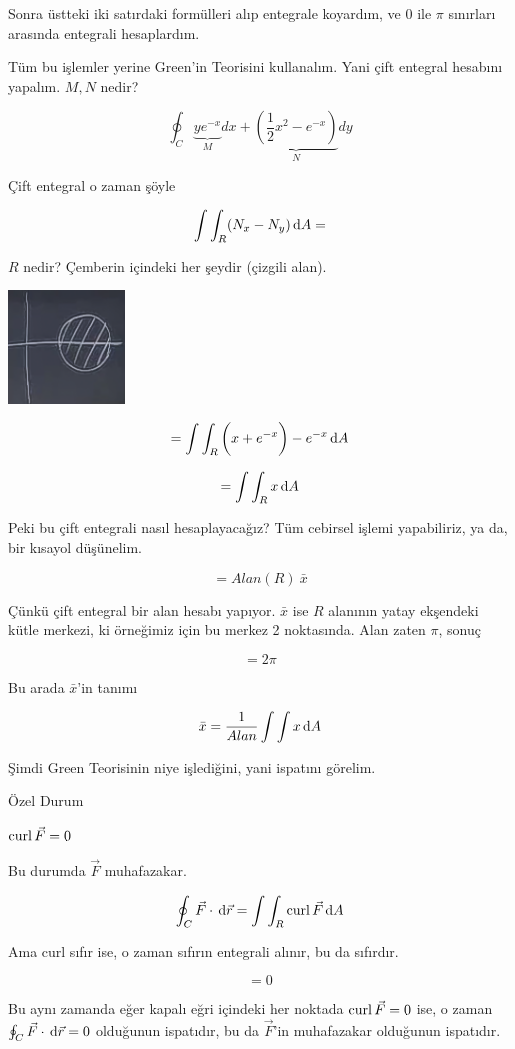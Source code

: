\documentclass[12pt,fleqn]{article}\usepackage{../../common}
\begin{document}
Sonra üstteki iki satırdaki formülleri alıp entegrale koyardım, ve 0 ile
$\pi$ sınırları arasında entegrali hesaplardım. 

Tüm bu işlemler yerine Green'in Teorisini kullanalım. Yani çift entegral
hesabını yapalım. $M,N$ nedir? 

$$ \oint_C 
\underbrace{ye^{-x}}_{M} dx + 
\underbrace{(\frac{1}{2}x^2 - e^{-x})}_{N}dy
$$

Çift entegral o zaman şöyle

$$ \int \int_R (N_x - N_y) \,\mathrm{d} A = $$

$R$ nedir? Çemberin içindeki her şeydir (çizgili alan). 

\includegraphics[height=3cm]{22_2.png}

$$= \int \int_R \bigg( x+ e^{-x} \bigg) - e^{-x} \,\mathrm{d} A $$

$$=  \int \int_R  x \,\mathrm{d} A $$

Peki bu çift entegrali nasıl hesaplayacağız? Tüm cebirsel işlemi
yapabiliriz, ya da, bir kısayol düşünelim. 

$$ = Alan(R) \ \bar{x} $$

Çünkü çift entegral bir alan hesabı yapıyor. $\bar{x}$ ise $R$ alanının
yatay ekşendeki kütle merkezi, ki örneğimiz için bu merkez 2
noktasında. Alan zaten $\pi$, sonuç

$$ = 2\pi $$

Bu arada $\bar{x}$'in tanımı

$$ \bar{x} = \frac{1}{Alan} \int \int x \,\mathrm{d} A $$


Şimdi Green Teorisinin niye işlediğini, yani ispatını görelim. 

Özel Durum 

$\operatorname{curl} \vec{F} = 0$

Bu durumda $\vec{F}$ muhafazakar. 

$$ \oint_C \vec{F} \cdot \,\mathrm{d}\vec{r} = \int \int_R \operatorname{curl} \vec{F} \,\mathrm{d} A $$

Ama curl sıfır ise, o zaman sıfırın entegrali alınır, bu da sıfırdır. 

$$ = 0 $$

Bu aynı zamanda eğer kapalı eğri içindeki her noktada $\operatorname{curl} \vec{F} = 0$ ise,
o zaman $\oint_C \vec{F} \cdot \,\mathrm{d}\vec{r} = 0$ olduğunun ispatıdır, bu da
$\vec{F}$'in muhafazakar olduğunun ispatıdır.
\end{document}
